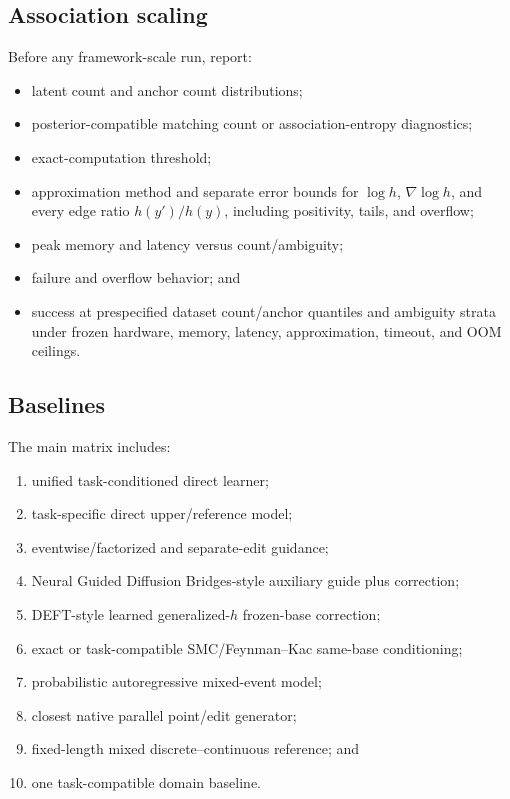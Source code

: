 \documentclass[11pt]{article}
\begin{document}
\subsection{Association scaling}
\label{sec:association-scaling}

Before any framework-scale run, report:

\begin{itemize}
\item latent count and anchor count distributions;
\item posterior-compatible matching count or association-entropy diagnostics;
\item exact-computation threshold;
\item approximation method and separate error bounds for \(\log h\), \(\nabla\log h\), and every edge ratio \(h(y')/h(y)\), including positivity, tails, and overflow;
\item peak memory and latency versus count/\allowbreak{}ambiguity;
\item failure and overflow behavior; and
\item success at prespecified dataset count/\allowbreak{}anchor quantiles and ambiguity strata under frozen hardware, memory, latency, approximation, timeout, and OOM ceilings.
\end{itemize}

\subsection{Baselines}
\label{sec:baselines}

The main matrix includes:

\begin{enumerate}
\item unified task-conditioned direct learner;
\item task-specific direct upper/\allowbreak{}reference model;
\item eventwise/\allowbreak{}factorized and separate-edit guidance;
\item Neural Guided Diffusion Bridges-style auxiliary guide plus correction;
\item DEFT-style learned generalized-\(h\) frozen-base correction;
\item exact or task-compatible SMC/\allowbreak{}Feynman--Kac same-base conditioning;
\item probabilistic autoregressive mixed-event model;
\item closest native parallel point/\allowbreak{}edit generator;
\item fixed-length mixed discrete--continuous reference; and
\item one task-compatible domain baseline.
\end{enumerate}
\end{document}
